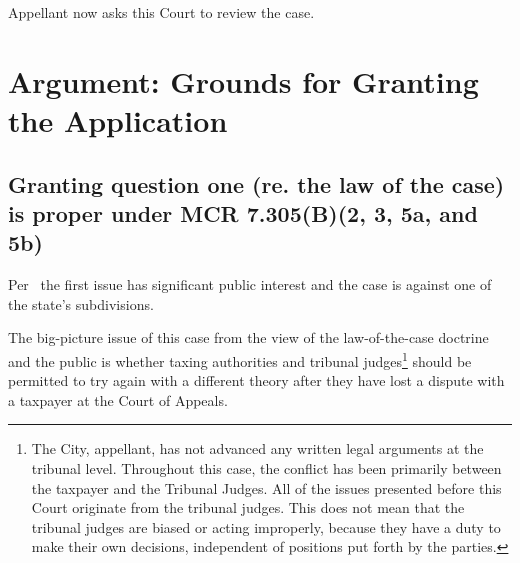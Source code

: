 \documentclass[12pt,\documentclassflag]{michiganCourtOfAppealsBrief}
\begin{document}
Appellant now asks this Court to review the case.






\section{Argument: Grounds for Granting the Application}

\subsection{Granting question one (re. the law of the case) is proper under MCR 7.305(B)(2, 3, 5a, and 5b)}

Per \cite{MCR 7.305(B)(2)}\ the first issue has significant public interest and the case is against one of the state's subdivisions.

The big-picture issue of this case from the view of the law-of-the-case doctrine and the public is whether taxing authorities and tribunal judges\footnote{The City, appellant, has not advanced any written legal arguments at the tribunal level. Throughout this case, the conflict has been primarily between the taxpayer and the Tribunal Judges. All of the issues presented before this Court originate from the tribunal judges. This does not mean that the tribunal judges are biased or acting improperly, because they have a duty to make their own decisions, independent of positions put forth by the parties.} should be permitted to try again with a different theory after they have lost a dispute with a taxpayer at the Court of Appeals.
\end{document}
